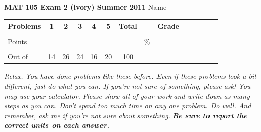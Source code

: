 \documentclass[12pt]{article}
\begin{document}
\textbf{MAT 105 Exam 2 (ivory) Summer 2011} \hspace{.4in} {\large Name} \hrulefill

\begin{center}

\begin{tabular}
{|l|c|c|c|c|c|c|c|c|c|c|c|c|c|} \hline

 Problems & \hspace{5 pt} 1 \hspace{5 pt}  & \hspace{5 pt} 2 \hspace{5 pt} & \hspace{5 pt} 3  \hspace{5 pt} & \hspace{5 pt} 4  \hspace{5 pt} & \hspace{5 pt}5 \hspace{5 pt} & \hspace{5 pt} Total  \hspace{5 pt} & &  \hspace{5 pt} Grade \hspace{5 pt}  \\ \hline
&&&&&&&&\\  
Points &&&&&&&    \hspace{.8in}\% &  \\ 
&&&&&&&& \\  \hline
Out of & 14 & 26 & 24  & 16 & 20 &100 & & \\ \hline

\end {tabular}

\end{center}

\vspace{.2in}

 \emph{Relax.  You have done problems like these before.  Even if these problems look a bit different, just do what you can.  If you're not sure of something, please ask! You may use your calculator.  Please show all of your work and write down as many steps as you can.  Don't spend too much time on any one problem.  Do well.  And remember, ask me if you're not sure about something.  \textbf{Be sure to report the correct units on each answer.}}

\hrulefill
\end{document}

